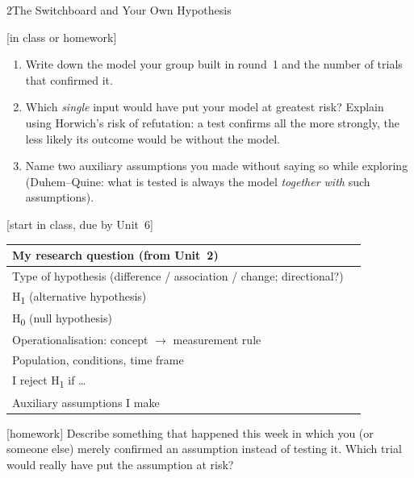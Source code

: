\begin{uebungsblattb}{2}{The Switchboard and Your Own Hypothesis}

[in class or homework]
\begin{enumerate}
  \item Write down the model your group built in round~1 and the number of
    trials that confirmed it.
  \item Which \emph{single} input would have put your model at greatest
    risk? Explain using Horwich's risk of refutation: a test confirms all
    the more strongly, the less likely its outcome would be without the
    model.
  \item Name two auxiliary assumptions you made without saying so while
    exploring (Duhem--Quine: what is tested is always the model
    \emph{together with} such assumptions).
\end{enumerate}

[start in class, due by Unit~6]
\begin{center}
\renewcommand{\arraystretch}{1.6}
\begin{tabular}{|p{}|p{}|}
\hline
My research question (from Unit~2) & \\[6mm] \hline
Type of hypothesis (difference / association / change; directional?) & \\ \hline
H\textsubscript{1} (alternative hypothesis) & \\[8mm] \hline
H\textsubscript{0} (null hypothesis) & \\[8mm] \hline
Operationalisation: concept $\to$ measurement rule & \\[8mm] \hline
Population, conditions, time frame & \\ \hline
I reject H\textsubscript{1} if \ldots & \\[8mm] \hline
Auxiliary assumptions I make & \\[6mm] \hline
\end{tabular}
\end{center}

[homework]
Describe something that happened this week in which you (or someone else)
merely confirmed an assumption instead of testing it. Which trial would
really have put the assumption at risk?


\end{uebungsblattb}

